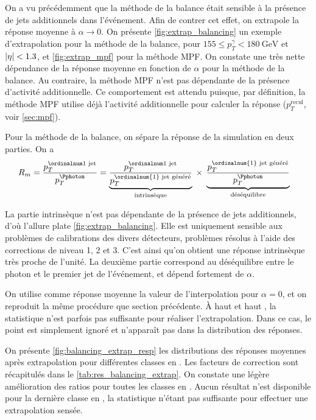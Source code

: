 On a vu précédemment que la méthode de la balance était sensible à la présence de jets additionnels dans l'événement. Afin de contrer cet effet, on extrapole la réponse moyenne à $\alpha \rightarrow 0$. On présente \cref{fig:extrap_balancing} un exemple d'extrapolation pour la méthode de la balance, pour $155 \leq p_T^\gamma < \SI{180}{\GeV}$ et $\lvert \eta \rvert < \num{1.3}$, et \cref{fig:extrap_mpf} pour la méthode MPF. On constate une très nette dépendance de la réponse moyenne en fonction de $\alpha$ pour la méthode de la balance. Au contraire, la méthode MPF n'est pas dépendante de la présence d'activité additionnelle. Ce comportement est attendu puisque, par définition, la méthode MPF utilise déjà l'activité additionnelle pour calculer la réponse ($p_T^\text{recul}$, voir \cref{sec:mpf}).

Pour la méthode de la balance, on sépare la réponse de la simulation en deux parties. On a
\begin{align*}
  R_m &= \frac{\ptfjet}{\ptg} = \underbrace{ \frac{\ptfjet}{p_T^{\text{\ordinalnum{1} jet généré}}} }_{\text{intrinsèque}} \; \times \; \underbrace{ \frac{p_T^{\text{\ordinalnum{1} jet généré}}}{\ptg} }_{\text{déséquilibre}}
\end{align*}


La partie intrinsèque n'est pas dépendante de la présence de jets additionnels, d'où l'allure plate \cref{fig:extrap_balancing}. Elle est uniquement sensible aux problèmes de calibrations des divers détecteurs, problèmes résolus à l'aide des corrections de niveau 1, 2 et 3. C'est ainsi qu'on obtient une réponse intrinsèque très proche de l'unité. La deuxième partie correspond au déséquilibre entre le photon et le premier jet de l'événement, et dépend fortement de $\alpha$.

On utilise comme réponse moyenne la valeur de l'interpolation pour $\alpha = 0$, et on reproduit la même procédure que section précédente. À haut \pt et haut \aeta, la statistique n'est parfois pas suffisante pour réaliser l'extrapolation. Dans ce cas, le point est simplement ignoré et n'apparaît pas dans la distribution des réponses.

On présente \cref{fig:balancing_extrap_resp} les distributions des réponses moyennes après extrapolation pour différentes classes en \aeta. Les facteurs de correction sont récapitulés dans le \cref{tab:res_balancing_extrap}. On constate une légère amélioration des ratios pour toutes les classes en \aeta. Aucun résultat n'est disponible pour la dernière classe en \aeta, la statistique n'étant pas suffisante pour effectuer une extrapolation sensée.

